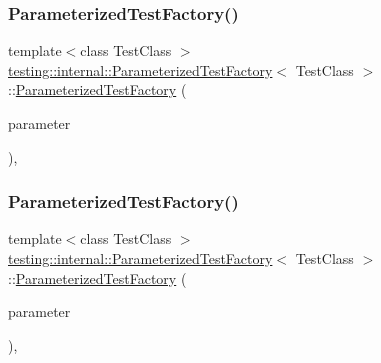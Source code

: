 \subsubsection{\texorpdfstring{ParameterizedTestFactory()}{ParameterizedTestFactory()}\hspace{0.1cm}{\footnotesize\ttfamily [2/3]}}
{\footnotesize\ttfamily template$<$class Test\+Class $>$ \\
\mbox{\hyperlink{classtesting_1_1internal_1_1_parameterized_test_factory}{testing\+::internal\+::\+Parameterized\+Test\+Factory}}$<$ Test\+Class $>$\+::\mbox{\hyperlink{classtesting_1_1internal_1_1_parameterized_test_factory}{Parameterized\+Test\+Factory}} (\begin{DoxyParamCaption}\item[{\mbox{\hyperlink{classtesting_1_1internal_1_1_parameterized_test_factory_ad9a27b8e1a83de2f1687625bccff460d}{Param\+Type}}}]{parameter }\end{DoxyParamCaption})\hspace{0.3cm}{\ttfamily [inline]}, {\ttfamily [explicit]}}

\mbox{\label{classtesting_1_1internal_1_1_parameterized_test_factory_a82d78356cd402224255edec760a048fb}} 
\subsubsection{\texorpdfstring{ParameterizedTestFactory()}{ParameterizedTestFactory()}\hspace{0.1cm}{\footnotesize\ttfamily [3/3]}}
{\footnotesize\ttfamily template$<$class Test\+Class $>$ \\
\mbox{\hyperlink{classtesting_1_1internal_1_1_parameterized_test_factory}{testing\+::internal\+::\+Parameterized\+Test\+Factory}}$<$ Test\+Class $>$\+::\mbox{\hyperlink{classtesting_1_1internal_1_1_parameterized_test_factory}{Parameterized\+Test\+Factory}} (\begin{DoxyParamCaption}\item[{\mbox{\hyperlink{classtesting_1_1internal_1_1_parameterized_test_factory_ad9a27b8e1a83de2f1687625bccff460d}{Param\+Type}}}]{parameter }\end{DoxyParamCaption})\hspace{0.3cm}{\ttfamily [inline]}, {\ttfamily [explicit]}}



